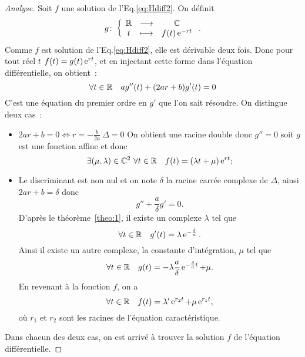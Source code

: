 \begin{proof}[Analyse] Soit $f$ une solution de l'Eq.\eqref{eq:Hdiff2}. On définit
  \begin{equation}
    g\colon \left\{\begin{array}{ccc} \mathbb{R} & \longrightarrow &\mathbb{C}\\ t & \longmapsto & f(t)\operatorname{e}^{-rt} \end{array} \right..
  \end{equation}
  Comme $f$ est solution de l'Eq.\eqref{eq:Hdiff2}, elle est dérivable deux fois. Donc pour tout réel $t$ $f(t)=g(t) \operatorname{e}^{rt}$, et en injectant cette forme dans l'équation différentielle, on obtient~:
\begin{equation}
  \forall t \in \mathbb{R} \quad ag''(t)+(2ar+b)g'(t)=0
\end{equation}
C'est une équation du premier ordre en $g'$ que l'on sait résoudre. On distingue deux cas~:
\begin{itemize}
\item $2ar+b=0 \iff r=-\frac{b}{2a} \ \Delta = 0$ On obtient une racine double donc $g''=0$ soit $g$ est une fonction affine et donc 
  \begin{equation}
   \exists (\mu,\lambda) \in \mathbb{C}^2 \ \forall t \in \mathbb{R} \quad f(t)=(\lambda t+\mu)\operatorname{e}^{rt};
  \end{equation}
\item Le discriminant est non nul et on note $\delta$ la racine carrée complexe de $\Delta$, ainsi $2ar+b=\delta$ donc 
  \begin{equation}
    g''+\frac{a}{\delta} g'=0.
  \end{equation}
D'après le théorème~\ref{theo:1}, il existe un complexe $\lambda$ tel que
\begin{equation}
  \forall t \in \mathbb{R} \quad g'(t)=\lambda \operatorname{e}^{-\frac{\delta}{a}}.
\end{equation}
Ainsi il existe un autre complexe, la constante d'intégration, $\mu$ tel que
\begin{equation}
 \forall t \in \mathbb{R} \quad g(t)=-\lambda \frac{a}{\delta} \operatorname{e}^{-\frac{\delta}{a} t} + \mu. 
\end{equation}
En revenant à la fonction $f$, on a
\begin{equation}
  \forall t \in \mathbb{R} \quad f(t)=\lambda' \operatorname{e}^{r_2 t} + \mu \operatorname{e}^{r_1 t},
\end{equation}
où $r_1$ et $r_2$ sont les racines de l'équation caractéristique.
\end{itemize}
Dans chacun des deux cas, on est arrivé à trouver la solution $f$ de l'équation différentielle.
\end{proof}
